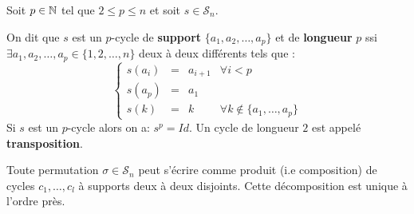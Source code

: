 \begin{definition}[Cycle]
	Soit $p \in \mathbb{N}$ tel que $ 2 \leq p \leq n $ et soit $s \in \mathcal{S}_n$.

    On dit que $s$ est un $p$-cycle de \textbf{support} $\{a_1, a_2, \dots , a_p \}$ et de \textbf{longueur} $p$ ssi $ \exists a_1, a_2, \dots , a_p \in \{1, 2, \dots , n\}$ deux à deux différents tels que :
    \[
        \left \{
            \begin{array}{cccc }
                s(a_i) & = & a_{i+1} & \forall i < p \\
                s(a_p) & = & a_1 & \\
                s(k) & = & k & \forall k \not \in \{a_1, \dots , a_p\}
            \end{array}
        \right.
    \]
	Si $s$ est un $p$-cycle alors on a: $ { s^p = Id} $.
	Un cycle de longueur $2$ est appelé \textbf{transposition}.
\end{definition}

\begin{theorem}
		Toute permutation $\sigma \in \mathcal{S}_n$ peut s'écrire comme produit (i.e composition) 
		de cycles $c_1,\dots,c_l$ à supports deux à deux disjoints. 
		Cette décomposition est unique à l'ordre près.
\end{theorem}

